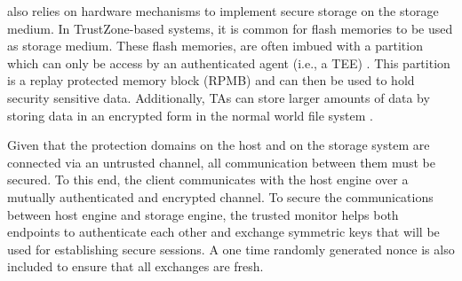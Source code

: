 \project{} also relies on hardware mechanisms to implement secure storage on the storage medium. %
In TrustZone-based systems, it is common for flash memories to be used as storage medium.
These flash memories, are often imbued with a partition which can only be access by an authenticated agent (i.e., a TEE) \cite{emmcrpmb, opteesecurestorage}. 
This partition is a replay protected memory block (RPMB) and can then be used to hold security sensitive data. %
Additionally, TAs 
can store larger amounts of data by storing data in an encrypted form in the normal world file system \cite{opteesecurestorage}.

 Given that the protection domains on the host and on the storage system are connected via an untrusted channel, all communication between them must be secured. To this end, the client communicates with the host engine over a mutually authenticated and encrypted channel. To secure the communications between host engine and storage engine, the trusted monitor helps both endpoints to authenticate each other and exchange symmetric keys that will be used for establishing secure sessions. A one time randomly generated nonce is also included to ensure that all exchanges are fresh.

